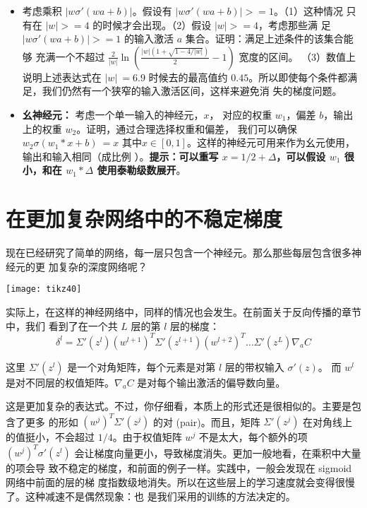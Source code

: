 \begin{itemize}
\item 考虑乘积 $|w\sigma'(wa+b)|$。假设有 $|w\sigma'(wa+b)| >= 1$。（1）这种情况
  只有在 $|w| >= 4$ 的时候才会出现。（2）假设 $|w| >= 4$，考虑那些满
  足 $|w\sigma'(wa+b)| >= 1$ 的输入激活 $a$ 集合。证明：满足上述条件的该集合能够
  充满一个不超过 $\frac{2}{|w|}\ln(\frac{|w|(1+\sqrt{1-4/|w|})}{2}-1)$ 宽度的区间。
  （3）数值上说明上述表达式在 $|w| ~= 6.9$ 时候去的最高值约
  $0.45$。所以即使每个条件都满足，我们仍然有一个狭窄的输入激活区间，这样来避免消
  失的梯度问题。
\item \textbf{幺神经元：}\label{identity_neuron} 考虑一个单一输入的神经元，$x$，
  对应的权重 $w_1$，偏差 $b$，输出上的权重 $w_2$。证明，通过合理选择权重和偏差，
  我们可以确保 $w_2 \sigma(w_1*x +b)~=x$
  其中$x \in [0, 1]$。这样的神经元可用来作为幺元使用，输出和输入相同（成比例
  ）。\textbf{提示：可以重写 $x = 1/2 + \Delta$，可以假设 $w_1$ 很小，和在 $w_1 *
    \Delta$ 使用泰勒级数展开}。
\end{itemize}

\section{在更加复杂网络中的不稳定梯度}

现在已经研究了简单的网络，每一层只包含一个神经元。那么那些每层包含很多神经元的更
加复杂的深度网络呢？
\begin{center}
  \texttt{[image: tikz40]}
\end{center}
 
实际上，在这样的神经网络中，同样的情况也会发生。在前面关于反向传播的章节中，我们
看到了在一个共 $L$ 层的第 $l$ 层的梯度：
\begin{equation}
  \delta^l = \Sigma'(z^l) (w^{l+1})^T \Sigma'(z^{l+1}) (w^{l+2})^T \ldots
  \Sigma'(z^L) \nabla_a C
  \label{eq:124}\tag{124}
\end{equation}

这里 $\Sigma'(z^l)$ 是一个对角矩阵，每个元素是对第 $l$ 层的带权输入 $\sigma'(z)$。
而 $w^l$ 是对不同层的权值矩阵。$\nabla_{a} C$ 是对每个输出激活的偏导数向量。
 
这是更加复杂的表达式。不过，你仔细看，本质上的形式还是很相似的。主要是包含了更多
的形如 $(w^j)^T \Sigma' (z^j)$ 的对 (pair)。而且，矩阵 $\Sigma'(z^j)$ 在对角线上
的值挺小，不会超过 $1/4$。由于权值矩阵 $w^j$ 不是太大，每个额外的项 $(w^j)^T
\sigma' (z^l)$ 会让梯度向量更小，导致梯度消失。更加一般地看，在乘积中大量的项会导
致不稳定的梯度，和前面的例子一样。实践中，一般会发现在 sigmoid网络中前面的层的梯
度指数级地消失。所以在这些层上的学习速度就会变得很慢了。这种减速不是偶然现象：也
是我们采用的训练的方法决定的。

